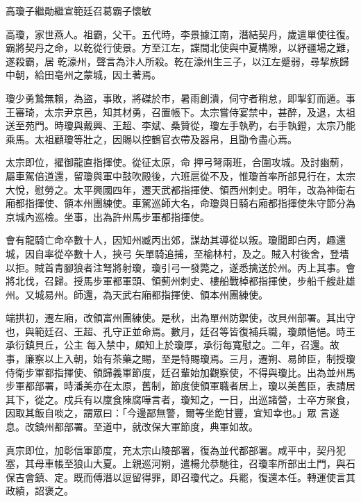 
\begin{pinyinscope}

 高瓊子繼勛繼宣範廷召葛霸子懷敏



 高瓊，家世燕人。祖霸，父干。五代時，李景據江南，潛結契丹，歲遣單使往復。霸將契丹之命，以乾從行使景。方至江左，諜間北使與中夏構隙，以紓疆場之難，遂殺霸，居
 乾濠州，聲言為汴人所殺。乾在濠州生三子，以江左蹙弱，尋挈族歸中朝，給田亳州之蒙城，因土著焉。



 瓊少勇鷙無賴，為盜，事敗，將磔於市，暑雨創潰，伺守者稍怠，即掣釘而遁。事王審琦，太宗尹京邑，知其材勇，召置帳下。太宗嘗侍宴禁中，甚醉，及退，太祖送至苑門。時瓊與戴興、王超、李斌、桑贊從，瓊左手執靮，右手執鐙，太宗乃能乘馬。太祖顧瓊等壯之，因賜以控鶴官衣帶及器帛，且勖令盡心焉。



 太宗即位，擢御龍直指揮使。從征太原，命
 押弓弩兩班，合圍攻城。及討幽薊，屬車駕倍道還，留瓊與軍中鼓吹殿後，六班扈從不及，惟瓊首率所部見行在，太宗大悅，慰勞之。太平興國四年，遷天武都指揮使、領西州刺史。明年，改為神衛右廂都指揮使、領本州團練使。車駕巡師大名，命瓊與日騎右廂都指揮使朱守節分為京城內巡檢。坐事，出為許州馬步軍都指揮使。



 會有龍騎亡命卒數十人，因知州臧丙出郊，謀劫其導從以叛。瓊聞即白丙，趣還城，因自率從卒數十人，挾弓
 矢單騎追捕，至榆林村，及之。賊入村後舍，登墻以拒。賊首青腳狼者注弩將射瓊，瓊引弓一發斃之，遂悉擒送於州。丙上其事。會將北伐，召歸。授馬步軍都軍頭、領薊州刺史、樓船戰棹都指揮使，步船千艘赴雄州。又城易州。師還，為天武右廂都指揮使、領本州團練使。



 端拱初，遷左廂，改領富州團練使。是秋，出為單州防禦使，改貝州部署。其出守也，與範廷召、王超、孔守正並命焉。數月，廷召等皆復補兵職，瓊頗悒悒。時王承衍鎮貝丘，公主
 每入禁中，頗知上於瓊厚，承衍每寬慰之。二年，召還。故事，廉察以上入朝，始有茶藥之賜，至是特賜瓊焉。三月，遷朔、易帥臣，制授瓊侍衛步軍都指揮使、領歸義軍節度，廷召輩始加觀察使，不得與瓊比。出為並州馬步軍都部署，時潘美亦在太原，舊制，節度使領軍職者居上，瓊以美舊臣，表請居其下，從之。戍兵有以廩食陳腐嘩言者，瓊知之，一日，出巡諸營，士卒方聚食，因取其飯自啖之，謂眾曰：「今邊鄙無警，爾等坐飽甘豐，宜知幸也。」眾
 言遂息。改鎮州都部署。至道中，就改保大軍節度，典軍如故。



 真宗即位，加彰信軍節度，充太宗山陵部署，復為並代都部署。咸平中，契丹犯塞，其母車帳至狼山大夏。上親巡河朔，遣楊允恭馳往，召瓊率所部出土門，與石保吉會鎮、定。既而傅潛以逗留得罪，即召瓊代之。兵罷，復還本任。轉運使言其政績，詔褒之。




\end{pinyinscope}
